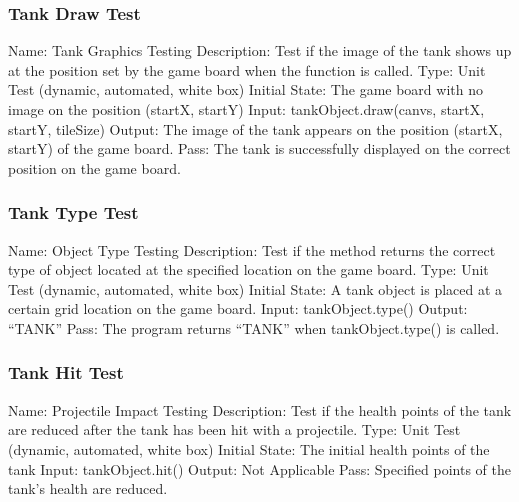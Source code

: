 \documentclass{article}
\begin{document}
\subsubsection{Tank Draw Test}
Name: Tank Graphics Testing\newline
Description: Test if the image of the tank shows up at the position set by the game board when the function is called.\newline
Type: Unit Test (dynamic, automated, white box)\newline
Initial State: The game board with no image on the position (startX, startY)\newline
Input: tankObject.draw(canvs, startX, startY, tileSize)\newline
Output: The image of the tank appears on the position (startX, startY) of the game board.\newline
Pass: The tank is successfully displayed on the correct position on the game board.\newline

\subsubsection{Tank Type Test}
Name: Object Type Testing\newline
Description: Test if the method returns the correct type of object located at the specified location on the game board.\newline
Type: Unit Test (dynamic, automated, white box)\newline
Initial State: A tank object is placed at a certain grid location on the game board.\newline
Input: tankObject.type()\newline
Output: “TANK”\newline
Pass: The program returns “TANK” when tankObject.type() is called.\newline

\subsubsection{Tank Hit Test}
Name: Projectile Impact Testing\newline
Description: Test if the health points of the tank are reduced after the tank has been hit with a projectile.\newline
Type: Unit Test (dynamic, automated, white box)\newline
Initial State: The initial health points of the tank\newline
Input: tankObject.hit()\newline
Output: Not Applicable\newline
Pass: Specified points of the tank’s health are reduced.\newline
\end{document}
